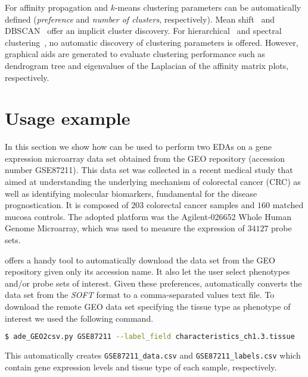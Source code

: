 For affinity propagation \cite{frey2007clustering} and $k$-means \cite{bishop2006pattern} clustering parameters can be automatically defined (\emph{preference} and \emph{number of clusters}, respectively).
Mean shift~\cite{comaniciu2002mean} and DBSCAN~\cite{ester1996density} offer an implicit cluster discovery.
For hierarchical~\cite{hastie2009elements} and spectral clustering~\cite{shi2000normalized}, no automatic discovery of clustering parameters is offered. However, graphical aids are generated to evaluate clustering performance such as dendrogram tree and eigenvalues of the Laplacian of the affinity matrix plots, respectively.


\section{Usage example} \label{sec:usage_example}
In this section we show how \ade can be used to perform two EDAs on a gene expression microarray data set obtained from the GEO repository (accession number GSE87211).
This data set was collected in a recent medical study that aimed at understanding the underlying mechanism of colorectal cancer (CRC) as well as identifying molecular biomarkers, fundamental for the disease prognostication.
It is composed of $203$ colorectal cancer samples and $160$ matched mucosa controls. The adopted platform was the Agilent-026652 Whole Human Genome Microarray, which was used to measure the expression of $34127$ probe sets.

\ade offers a handy tool to automatically download the data set from the GEO repository given only its accession name.
It also let the user select phenotypes and/or probe sets of interest. Given these preferences, \ade automatically converts the data set from the \textit{SOFT} format to a comma-separated values text file. To download the remote GEO data set specifying the tissue type as phenotype of interest we used the following command.

{\footnotesize
\begin{lstlisting}[language=bash,caption={ }]
$ ade_GEO2csv.py GSE87211 --label_field characteristics_ch1.3.tissue
\end{lstlisting}
}

\noindent This automatically creates \texttt{{\footnotesize GSE87211\_data.csv}} and \texttt{{\footnotesize GSE87211\_labels.csv}} which contain gene expression levels and tissue type of each sample, respectively.

